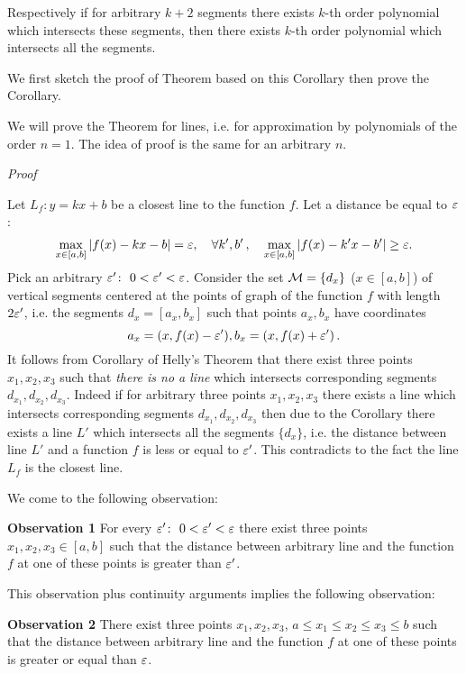 {Respectively if for arbitrary $k+2$ segments there 
exists $k$-th order polynomial   which intersects these segments,
then there exists $k$-th order polynomial  which 
intersects all the segments.

\m

 We first sketch the proof of Theorem based on this Corollary
then prove the Corollary.

  We will prove the Theorem for lines,
i.e. for approximation by polynomials of the order $n=1$. 
The idea of proof is the same for
an arbitrary $n$.

{\sl Proof}




 Let $L_f\colon y=kx+b$ be a closest line to the function $f$.
Let a distance be equal to ${\varepsilon}$:
                       $$
   \max_{x\in [a,b]}|f(x)-kx-b|={\varepsilon},\quad
\forall k',b'\,,\quad
\max_{x\in [a,b]}|f(x)-k'x-b'|\geq {\varepsilon}. 
                    $$
Pick an arbitrary ${\varepsilon}'\colon\,\, 0<{\varepsilon}'<{\varepsilon}$. Consider the set
${\cal M}=\{d_x\}$ ($x\in [a,b]$) of vertical segments
centered at the points of graph of the function $f$
with length $2{\varepsilon}'$, i.e. the
 segments $d_x=[a_x,b_x]$ such that points $a_x,b_x$
have coordinates
                $$
   a_x=(x,f(x)-{\varepsilon}'), b_x=(x,f(x)+{\varepsilon}')\,.
                $$ 
It follows from Corollary  of Helly's Theorem that 
there exist three points $x_1,x_2,x_3$ such that 
{\it there is no a line}
which intersects corresponding segments $d_{x_1},d_{x_2}, d_{x_3}$.
Indeed if for arbitrary three points
$x_1,x_2,x_3$ there exists  a line
which intersects corresponding segments $d_{x_1},d_{x_2}, d_{x_3}$
then due to the Corollary there exists a line $L'$ 
which intersects  all the segments
$\{d_x\}$, i.e. the distance between line
$L'$ and a function $f$ is less or equal to ${\varepsilon}'$. This contradicts
to the fact the line $L_f$ is the closest line.

We come to the following observation:

{\bf Observation 1} For every ${\varepsilon}'\colon\,\,0<{\varepsilon}'<{\varepsilon}$
there exist three points $x_1,x_2,x_3\in [a,b]$ such that 
the distance between arbitrary line and the function $f$
at one of these points is greater than ${\varepsilon}'$.
             

This observation plus  continuity arguments implies the following 
observation:



{\bf Observation 2} There exist three points 
$x_1,x_2,x_3$,  $a\leq x_1\leq x_2\leq x_3\leq b$ such that  
the distance between arbitrary line and the function $f$
at one of these points is greater or equal than ${\varepsilon}$.


}

